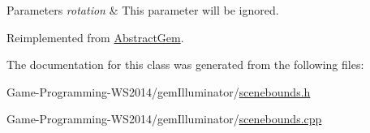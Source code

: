 \begin{DoxyParams}{Parameters}
{\em rotation} & This parameter will be ignored. \\
\hline
\end{DoxyParams}


Reimplemented from \hyperlink{class_abstract_gem_afce4d09f74fec117d27b11a220eee6b9}{Abstract\+Gem}.



The documentation for this class was generated from the following files\+:\begin{DoxyCompactItemize}
\item 
Game-\/\+Programming-\/\+W\+S2014/gem\+Illuminator/\hyperlink{scenebounds_8h}{scenebounds.\+h}\item 
Game-\/\+Programming-\/\+W\+S2014/gem\+Illuminator/\hyperlink{scenebounds_8cpp}{scenebounds.\+cpp}\end{DoxyCompactItemize}
